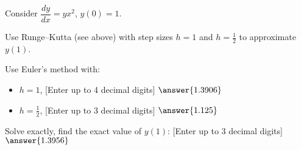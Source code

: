 \documentclass{ximera}
\begin{document}
\begin{exercise}
    Consider $\dfrac{dy}{dx} = yx^2$, $y(0)=1$.
    
    Use Runge--Kutta (see above) with step sizes $h=1$ and $h=\frac{1}{2}$ to approximate $y(1)$.
    
    \begin{problem}
        Use Euler's method with:
        \begin{itemize}
            \item $h=1$, [Enter up to 4 decimal digits] $\answer{1.3906}$
            \item $h=\frac{1}{2}$, [Enter up to 3 decimal digits] $\answer{1.125}$
        \end{itemize} 
        \begin{problem}
            Solve exactly, find the exact value of $y(1)$: [Enter up to 3 decimal digits] $\answer{1.3956}$%
        \end{problem}
    \end{problem}
\end{exercise}
%
\end{document}

